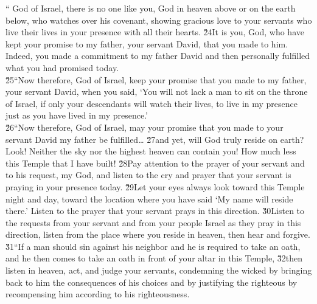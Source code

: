 \begin{poetry}
\poeml `` God of Israel, there is no one like you, God in heaven above or on the earth below, who watches over his covenant, showing gracious love to your servants who live their lives in your presence with all their hearts. \v{24}It is you,  God, who have kept your promise to my father, your servant David, that you made to him. Indeed, you made a commitment to my father David and then personally fulfilled what you had promised today. \\
\poeml \v{25}``Now therefore,  God of Israel, keep your promise that you made to my father, your servant David, when you said, `You will not lack a man to sit on the throne of Israel, if only your descendants will watch their lives, to live in my presence just as you have lived in my presence.' \\
\poeml \v{26}``Now therefore, God of Israel, may your promise that you made to your servant David my father be fulfilled{\ldots} \v{27}and yet, will God truly reside on earth? Look! Neither the sky nor the highest heaven can contain you! How much less this Temple that I have built! \v{28}Pay attention to the prayer of your servant and to his request,  my God, and listen to the cry and prayer that your servant is praying in your presence today. \v{29}Let your eyes always look toward this Temple night and day, toward the location where you have said `My name will reside there.' Listen to the prayer that your servant prays in this direction. \v{30}Listen to the requests from your servant and from your people Israel as they pray in this direction, listen from the place where you reside in heaven, then hear and forgive. \\
\poeml \v{31}``If a man should sin against his neighbor and he is required to take an oath, and he then comes to take an oath in front of your altar in this Temple, \v{32}then listen in heaven, act, and judge your servants, condemning the wicked by bringing back to him the consequences of his choices and by justifying the righteous by recompensing him according to his righteousness. \\

\end{poetry}
